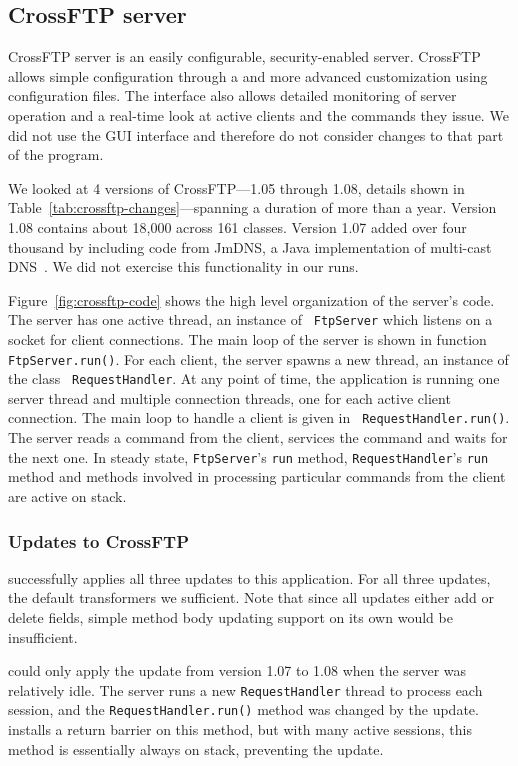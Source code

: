 

\subsection{CrossFTP server}
\label{subsec:crossftp}

CrossFTP server is an easily configurable, security-enabled \FTP server.
CrossFTP allows simple configuration through a \GUI and more advanced
customization using configuration files. The \GUI interface also allows
detailed monitoring of server operation and a real-time look at active
clients and the commands they issue.  We did not use the GUI interface and
therefore do not consider changes to that part of the program.



We looked at 4 versions of CrossFTP---1.05 through 1.08, details shown in
Table~\ref{tab:crossftp-changes}---spanning a duration of more than a year.
Version 1.08 contains about 18,000 \SLOC across 161 classes.  Version 1.07
added over four thousand \SLOC by including code from JmDNS, a Java
implementation of multi-cast DNS~\cite{jmdns}. We did not exercise this
functionality in our runs. 

Figure~\ref{fig:crossftp-code} shows the high level organization of the
server's code. The server has one active thread, an instance of {\tt
FtpServer} which listens on a socket for client connections. The main loop
of the server is shown in function {\tt FtpServer.run()}. For each client,
the server spawns a new thread, an instance of the class {\tt
RequestHandler}.  At any point of time, the application is running one
server thread and multiple connection threads, one for each active client
connection. The main loop to handle a client is given in {\tt
RequestHandler.run()}. The server reads a command from the client, services
the command and waits for the next one. In steady state, {\tt FtpServer}'s
{\tt run} method, {\tt RequestHandler}'s {\tt run} method and methods
involved in processing particular \FTP commands from the client are active
on stack.

\subsubsection{Updates to CrossFTP}

\JV successfully applies all three updates to this application. For all
three updates, the default transformers we sufficient. Note that since all
updates either add or delete fields, simple method body updating support on
its own would be insufficient.

\JV could only apply the update from version 1.07 to 1.08 when the server
was relatively idle. The server runs a new {\tt RequestHandler} thread to
process each \FTP session, and the \texttt{RequestHandler.run()} method was
changed by the update. \JV installs a return barrier on this method, but
with many active sessions, this method is essentially always on stack,
preventing the update.
